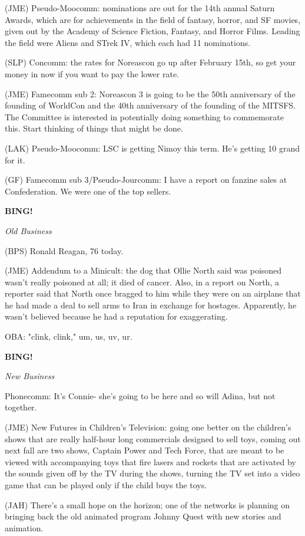 \documentclass[12pt]{article}
\newcommand{\bing}{{\bf BING!} }
\newcommand{\goto}[1]{\bing \vskip 12pt \centerline{{\em{#1}}}}
\begin{document}
(JME) Pseudo-Moocomm: nominations are out for the 14th annual Saturn Awards, which are for achievements in the field of fantasy, horror, and SF movies, given out by the Academy of Science Fiction, Fantasy, and Horror Films. Leading the field were Aliens and STrek IV, which each had 11 nominations.

(SLP) Concomm: the rates for Noreascon go up after February 15th, so get your money in now if you want to pay the lower rate.

(JME) Famecomm sub 2: Noreascon 3 is going to be the 50th anniversary of the founding of WorldCon and the 40th anniversary of the founding of the MITSFS. The Committee is interested in potentially doing something to commemorate this. Start thinking of things that might be done.

(LAK) Pseudo-Moocomm: LSC is getting Nimoy this term. He's getting 10 grand for it.

(GF) Famecomm sub 3/Pseudo-Jourcomm: I have a report on fanzine sales at Confederation. We were one of the top sellers.

\goto{Old Business}

(BPS) Ronald Reagan, 76 today.

(JME) Addendum to a Minicult: the dog that Ollie North said was poisoned wasn't really poisoned at all; it died of cancer. Also, in a report on North, a reporter said that North once bragged to him while they were on an airplane that he had made a deal to sell arms to Iran in exchange for hostages. Apparently, he wasn't believed because he had a reputation for exaggerating.

OBA: "clink, clink," um, us, uv, ur.

\goto{New Business}

Phonecomm: It's Connie- she's going to be here and so will Adina, but not together.

(JME) New Futures in Children's Television: going one better on the children's shows that are really half-hour long commercials designed to sell toys, coming out next fall are two shows, Captain Power and Tech Force, that are meant to be viewed with accompanying toys that fire lasers and rockets that are activated by the sounds given off by the TV during the shows, turning the TV set into a video game that can be played only if the child buys the toys.

(JAH) There's a small hope on the horizon; one of the networks is planning on bringing back the old animated program Johnny Quest with new stories and animation.
\end{document}
